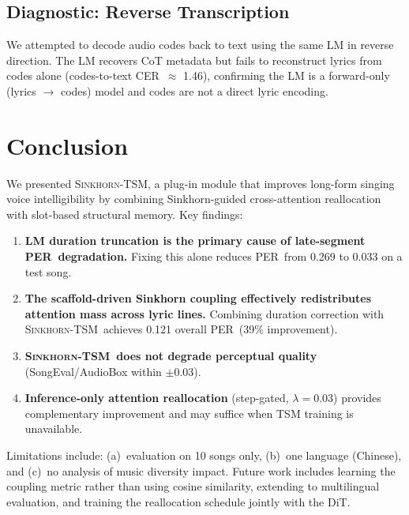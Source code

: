 \documentclass[11pt,a4paper]{article}
\newcommand{\method}{\textsc{Sinkhorn-TSM}}
\newcommand{\per}{PER}
\begin{document}
\subsection{Diagnostic: Reverse Transcription}

We attempted to decode audio codes back to text using the same LM in reverse direction. The LM recovers CoT metadata but fails to reconstruct lyrics from codes alone (codes-to-text CER~$\approx$ 1.46), confirming the LM is a forward-only (lyrics $\to$ codes) model and codes are not a direct lyric encoding.

\section{Conclusion}
\label{sec:conclusion}

We presented \method, a plug-in module that improves long-form singing voice intelligibility by combining Sinkhorn-guided cross-attention reallocation with slot-based structural memory. Key findings:

\begin{enumerate}
    \item \textbf{LM duration truncation is the primary cause of late-segment \per~degradation.} Fixing this alone reduces \per~from 0.269 to 0.033 on a test song.
    \item \textbf{The scaffold-driven Sinkhorn coupling effectively redistributes attention mass across lyric lines.} Combining duration correction with \method~achieves 0.121 overall \per~(39\% improvement).
    \item \textbf{\method~does not degrade perceptual quality} (SongEval/AudioBox within $\pm$0.03).
    \item \textbf{Inference-only attention reallocation} (step-gated, $\lambda=0.03$) provides complementary improvement and may suffice when TSM training is unavailable.
\end{enumerate}

Limitations include: (a)~evaluation on 10 songs only, (b)~one language (Chinese), and (c)~no analysis of music diversity impact. Future work includes learning the coupling metric rather than using cosine similarity, extending to multilingual evaluation, and training the reallocation schedule jointly with the DiT.
\end{document}
